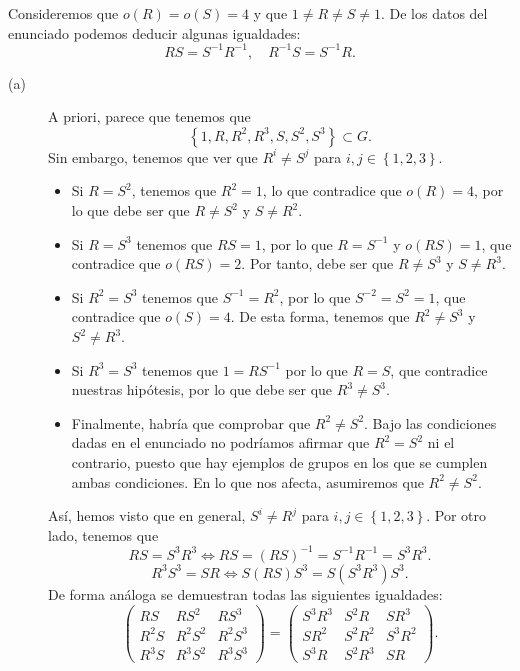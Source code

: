 \documentclass{article}
\begin{document}
\begin{sol}
Consideremos que $\displaystyle o\left(R\right) = o\left(S\right) = 4 $ y que $\displaystyle 1 \neq R \neq S \neq 1 $. De los datos del enunciado podemos deducir algunas igualdades:
\[RS = S^{-1}R^{-1}, \quad R^{-1}S = S^{-1}R .\]
\begin{description}
\item[(a)] A priori, parece que tenemos que
	\[ \left\{ 1, R, R^{2}, R^{3}, S, S^{2}, S^{3}\right\} \subset G .\]
	Sin embargo, tenemos que ver que $\displaystyle R^{i} \neq S^{j} $ para $\displaystyle i,j \in \left\{ 1,2,3\right\}  $. 
	\begin{itemize}
	\item Si $\displaystyle R = S^{2} $, tenemos que $\displaystyle R^{2} = 1 $, lo que contradice que $\displaystyle o\left(R\right) = 4 $, por lo que debe ser que $\displaystyle R \neq S^{2} $ y $\displaystyle S \neq R^{2} $.
	\item Si $\displaystyle R = S^{3} $ tenemos que $\displaystyle RS = 1 $, por lo que $\displaystyle R = S^{-1} $ y $\displaystyle o\left(RS\right) = 1 $, que contradice que $\displaystyle o\left(RS\right) = 2 $. Por tanto, debe ser que $\displaystyle R \neq S^{3} $ y $\displaystyle S \neq R^{3} $.
	\item Si $\displaystyle R^{2} = S^{3} $ tenemos que $\displaystyle S^{-1} = R^{2} $, por lo que $\displaystyle S^{-2} = S^{2} = 1 $, que contradice que $\displaystyle o\left(S\right) = 4 $. De esta forma, tenemos que $\displaystyle R^{2} \neq S^{3} $ y $\displaystyle S^{2} \neq R^{3} $.
	\item Si $\displaystyle R^{3} = S^{3} $ tenemos que $\displaystyle 1 = RS^{-1} $ por lo que $\displaystyle R = S $, que contradice nuestras hipótesis, por lo que debe ser que $\displaystyle R^{3} \neq S^{3} $.
	\item Finalmente, habría que comprobar que $\displaystyle R^{2} \neq S^{2} $. Bajo las condiciones dadas en el enunciado no podríamos afirmar que $\displaystyle R^{2} = S^{2} $ ni el contrario, puesto que hay ejemplos de grupos en los que se cumplen ambas condiciones. En lo que nos afecta, asumiremos que $\displaystyle R^{2} \neq S^{2} $.
	\end{itemize}
	Así, hemos visto que en general, $\displaystyle S^{i} \neq R^{j} $ para $\displaystyle i,j \in \left\{ 1,2,3\right\}  $. Por otro lado, tenemos que
	\[\boxed{RS = S^{3}R^{3} } \iff RS = \left(RS\right)^{-1} = S^{-1}R^{-1} = S^{3}R^{3} .\]
	\[\boxed{R^{3}S^{3} = SR} \iff S\left(RS\right)S^{3} = S\left(S^{3}R^{3}\right)S^{3} .\]
De forma análoga se demuestran todas las siguientes igualdades:
\[\begin{pmatrix} RS & RS^{2} & RS^{3} \\ 
R^{2}S & R^{2}S^{2} & R^{2}S^{3} \\
R^{3}S & R^{3}S^{2} & R^{3}S^{3}\end{pmatrix} = 
	\begin{pmatrix} S^{3}R^{3} & S^{2}R & SR^{3} \\
	SR^{2} & S^{2}R^{2} & S^{3}R^{2} \\
S^{3}R & S^{2}R^{3} & SR\end{pmatrix}.\]


\end{description}
\end{sol}
\end{document}
